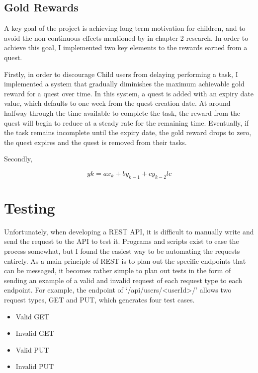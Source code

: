 \subsection{Gold Rewards}
A key goal of the project is achieving long term motivation for children, and to avoid the non-continuous effects mentioned by \cite{deci2001extrinsic} in chapter 2 research.
In order to achieve this goal, I implemented two key elements to the rewards earned from a quest.

Firstly, in order to discourage Child users from delaying performing a task, I implemented a system that gradually diminishes the maximum achievable gold reward for a quest over time. 
In this system, a quest is added with an expiry date value, which defaults to one week from the quest creation date.
At around halfway through the time available to complete the task, the reward from the quest will begin to reduce at a steady rate for the remaining time.
Eventually, if the task remains incomplete until the expiry date, the gold reward drops to zero, the quest expires and the quest is removed from their tasks.


Secondly, 

\begin{equation} \label{eq:openloopreward}
	yk = ax_k + by_{k-1} + cy_{k-2}lc
\end{equation}




\section{Testing}
Unfortunately, when developing a REST API, it is difficult to manually write and send the request to the API to test it.
Programs and scripts exist to ease the process somewhat, but I found the easiest way to be automating the requests entirely. 
As a main principle of REST is to plan out the specific endpoints that can be messaged, it becomes rather simple to plan out tests in the form of sending an example of a valid and invalid request of each request type to each endpoint.
For example, the endpoint of `/api/users/<userId>/' allows two request types, GET and PUT, which generates four test cases.
\begin{itemize}
	\item{Valid GET}
	\item{Invalid GET}
	\item{Valid PUT}
	\item{Invalid PUT}
\end{itemize}  

